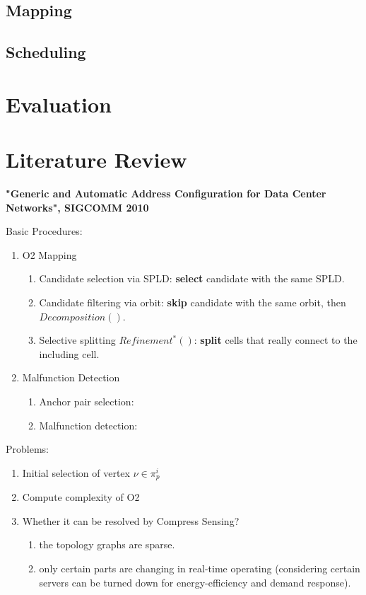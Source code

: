 \documentclass[journal,onecolumn,11pt]{IEEEtran}
\begin{document}
\subsection{Mapping}

\subsection{Scheduling}

\section{Evaluation}

\section{Literature Review}

\textbf{"Generic and Automatic Address Configuration for Data Center Networks", SIGCOMM 2010}

Basic Procedures:
\begin{enumerate}
  \item O2 Mapping
  \begin{enumerate}
    \item Candidate selection via SPLD: \textbf{select} candidate with the same SPLD.
    \item Candidate filtering via orbit: \textbf{skip} candidate with the same orbit, then $Decomposition()$.
    \item Selective splitting $Refinement^*()$: \textbf{split} cells that really connect to the including cell.
  \end{enumerate}
  \item Malfunction Detection
  \begin{enumerate}
    \item Anchor pair selection:
    \item Malfunction detection:
  \end{enumerate}
\end{enumerate}

Problems:
\begin{enumerate}
  \item Initial selection of vertex $\nu\in\pi_p^i$
  \item Compute complexity of O2
  \item Whether it can be resolved by Compress Sensing?
  \begin{enumerate}
    \item the topology graphs are sparse.
    \item only certain parts are changing in real-time operating (considering certain servers can be turned down for energy-efficiency and demand response).
  \end{enumerate}
\end{enumerate}
\end{document}
